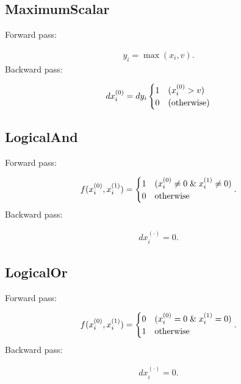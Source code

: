 \documentclass{article}
\begin{document}
\subsection{MaximumScalar}

Forward pass:

\begin{eqnarray}
  y_i = \max (x_i, v).
\end{eqnarray}
%
Backward pass:

\begin{eqnarray}
  dx^{(0)}_i = dy_i \begin{cases}
    1  & (x^{(0)}_i > v) \\
    0 & ({\rm otherwise})
  \end{cases}\\ 
\end{eqnarray}


\subsection{LogicalAnd}

Forward pass:

\begin{eqnarray}
  f(x^{(0)}_i,x^{(1)}_i) = \begin{cases}
    1 & (x^{(0)}_i \neq 0 \;\&\; x^{(1)}_i \neq 0) \\
    0 & {\rm otherwise}
  \end{cases}.
\end{eqnarray}
%
Backward pass:

\begin{eqnarray}
  dx^{(\cdot)}_i = 0.
\end{eqnarray}

\subsection{LogicalOr}

Forward pass:

\begin{eqnarray}
  f(x^{(0)}_i,x^{(1)}_i) = \begin{cases}
    0 & (x^{(0)}_i = 0 \;\&\; x^{(1)}_i = 0) \\
    1 & {\rm otherwise}
  \end{cases}.
\end{eqnarray}
%
Backward pass:

\begin{eqnarray}
  dx^{(\cdot)}_i = 0.
\end{eqnarray}
\end{document}
